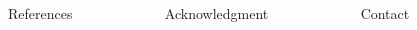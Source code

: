 \vfill
\begin{columns}[t, onlytextwidth]%
  \begin{column}{0.50\textwidth}%
    \begin{block}[equal height group=bottom]{\normalsize References}
      \footnotesize%
      \printbibliography%
    \end{block}
  \end{column}%
  \begin{column}{0.20\textwidth}%
    \begin{block}[equal height group=bottom]{\normalsize Acknowledgment}
        \footnotesize
        
    \end{block}
  \end{column}%
  \begin{column}{0.30\textwidth}%
    \begin{block}[equal height group=bottom]{\normalsize Contact}
      \begin{columns}[T]
        \begin{column}{0.2\textwidth}
              \begin{figure}

\end{figure}
\end{column}
\end{columns}
\end{block}
\end{column}
\end{columns}
